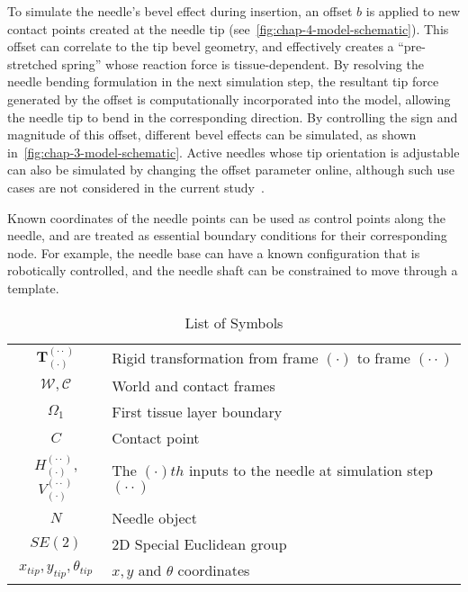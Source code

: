 To simulate the needle's bevel effect during insertion, an offset $b$ is applied to new contact points created at the needle tip (see~\cref{fig:chap-4-model-schematic}). This offset can correlate to the tip bevel geometry, and effectively creates a ``pre-stretched spring'' whose reaction force is tissue-dependent. By resolving the needle bending formulation in the next simulation step, the resultant tip force generated by the offset is computationally incorporated into the model, allowing the needle tip to bend in the corresponding direction. By controlling the sign and magnitude of this offset, different bevel effects can be simulated, as shown in~\cref{fig:chap-3-model-schematic}. Active needles whose tip orientation is adjustable can also be simulated by changing the offset parameter online, although such use cases are not considered in the current study~\parencite{ryuFeasibilityStudyOptically2011,karimi3DSteerableActive2019,padasdaoShapeMemoryAlloy2020}.

Known coordinates of the needle points can be used as control points along the needle, and are treated as essential boundary conditions for their corresponding node. For example, the needle base can have a known configuration that is robotically controlled, and the needle shaft can be constrained to move through a template.


\begin{table}[]
\caption{List of Symbols}
\label{tab:chap-4-list-of-symbols}
\begin{tabular}{cl}
$\mathbf{T}_{(\cdot)}^{(\cdot\cdot)}$ & Rigid transformation from frame $(\cdot)$ to frame $(\cdot\cdot)$ \\
$\mathcal{W}, \mathcal{C}$ & World and contact frames \\
$\Omega_1$ & First tissue layer boundary \\
$C$ & Contact point \\
$H_{(\cdot)}^{(\cdot\cdot)}$, $V_{(\cdot)}^{(\cdot\cdot)}$ & The $(\cdot)th$ inputs to the needle at simulation step $(\cdot\cdot)$ \\
$N$      & Needle object \\
$SE(2)$  & 2D Special Euclidean group  \\
$x_{tip}, y_{tip}, \theta_{tip}$ & $x, y$ and $\theta$ coordinates
\end{tabular}
\end{table}

